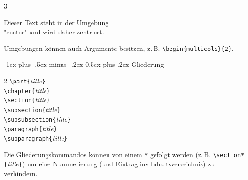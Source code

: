\documentclass[10pt,landscape]{article}
\makeatletter
\renewcommand{\section}{\@startsection{section}{1}{0mm}%
                                {-1ex plus -.5ex minus -.2ex}%
                                {0.5ex plus .2ex}%
                                {\normalfont\large\bfseries}}
\renewcommand{\subsection}{\@startsection{subsection}{2}{0mm}%
                                {-1explus -.5ex minus -.2ex}%
                                {0.5ex plus .2ex}%
                                {\normalfont\normalsize\bfseries}}
\renewcommand{\subsubsection}{\@startsection{subsubsection}{3}{0mm}%
                                {-1ex plus -.5ex minus -.2ex}%
                                {1ex plus .2ex}%
                                {\normalfont\small\bfseries}}
\makeatother
\begin{document}
\begin{multicols}{3}
\begin{center}
Dieser Text steht in der Umgebung\\
"center" und wird daher zentriert.
\end{center}

Umgebungen können auch Argumente besitzen, z.\,B. \verb!\begin{multicols}{2}!.

\section{Gliederung}
\begin{multicols}{2}
\verb!\part{!\textit{title}\verb!}!  \\
\verb!\chapter{!\textit{title}\verb!}!  \\
\verb!\section{!\textit{title}\verb!}!  \\
\verb!\subsection{!\textit{title}\verb!}!  \\
\verb!\subsubsection{!\textit{title}\verb!}!  \\
\verb!\paragraph{!\textit{title}\verb!}!  \\
\verb!\subparagraph{!\textit{title}\verb!}!
\end{multicols}
{\raggedright
Die Gliederungskommandos können von einem \texttt{*}
gefolgt werden (z.\,B.
\verb!\section*{!\textit{title}\verb!}!) um eine
Nummerierung (und Eintrag ins Inhaltsverzeichnis) zu
verhindern. }


\end{multicols}
\end{document}
